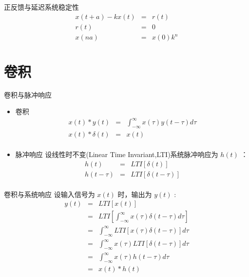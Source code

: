 \documentclass[presentation]{beamer}
\begin{document}
\begin{frame}[label={sec:orgeb08067}]{正反馈与延迟系统稳定性}
\begin{eqnarray*}
x(t+a)-kx(t) &=& r(t) \\
r(t) &=& 0 \\
x(na) &=& x(0)k^{n}
\end{eqnarray*}
\end{frame}

\section{卷积}
\label{sec:org38f146c}
\begin{frame}[label={sec:orgd517f99}]{卷积与脉冲响应}
\begin{itemize}
\item 卷积
\begin{eqnarray*}
x(t)*y(t) &=& \int_{-\infty}^{\infty}x(\tau)y(t-\tau)d\tau \\
x(t)*\delta(t)& = & x(t) \\
\end{eqnarray*}
\end{itemize}
\begin{itemize}
\item 脉冲响应
设线性时不变(Linear Time Invariant,LTI)系统脉冲响应为 \(h(t)\) ：
\begin{eqnarray*}
h(t) &=& LTI[\delta(t)]\\
h(t-\tau) &=& LTI[\delta(t-\tau)]\\
\end{eqnarray*}
\end{itemize}
\end{frame}

\begin{frame}[label={sec:org3fe28b0}]{卷积与系统响应}
设输入信号为 \(x(t)\) 时，输出为 \(y(t)\) :
\begin{eqnarray*}
y(t) & =& LTI[x(t)]\\
     &=& LTI\left[\int_{-\infty}^{\infty}x(\tau)\delta(t-\tau)d\tau\right] \\
     &=& \int_{-\infty}^{\infty} LTI[x(\tau)\delta(t-\tau)]d\tau \\
     &=& \int_{-\infty}^{\infty} x(\tau)LTI[\delta(t-\tau)]d\tau \\
     &=& \int_{-\infty}^{\infty} x(\tau) h(t-\tau)d\tau \\
     &=& x(t) * h(t)
\end{eqnarray*}
\end{frame}
\end{document}
